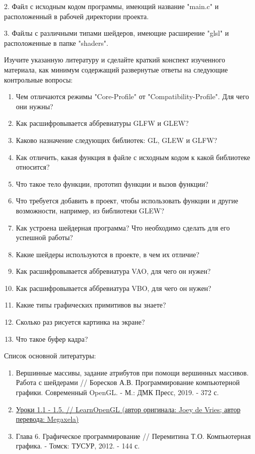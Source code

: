 \documentclass[a4paper,12pt]{article}
\theoremstyle{plain}
\begin{document}
    2. Файл с исходным кодом программы, имеющий название "main.c" и расположенный в рабочей директории проекта.
    
    3. Файлы с различными типами шейдеров, имеющие расширение "glsl" и расположенные в папке "shaders".
    
    
    
    Изучите указанную литературу и сделайте краткий конспект изученного материала, как минимум содержащий развернутые ответы на следующие контрольные вопросы:
    \begin{enumerate}
    \item Чем отличаются режимы "Core-Profile" от "Compatibility-Profile". Для чего они нужны?
    \item Как расшифровывается аббревиатуры GLFW и GLEW?
    \item Каково назначение следующих библиотек: GL, GLEW и GLFW? 
    \item Как отличить, какая функция в файле с исходным кодом к какой библиотеке относится?
    \item Что такое тело функции, прототип функции и вызов функции?
    \item Что требуется добавить в проект, чтобы использовать функции и другие возможности, например, из библиотеки GLEW?
    \item Как устроена шейдерная программа? Что необходимо сделать для его успешной работы?
    \item Какие шейдеры используются в проекте, в чем их отличие?
    \item Как расшифровывается аббревиатура VAO, для чего он нужен?
    \item Как расшифровывается аббревиатура VBO, для чего он нужен?
    \item Какие типы графических примитивов вы знаете?
    \item Сколько раз рисуется картинка на экране?
    \item Что такое буфер кадра?
    \end{enumerate}
    
    
    
    Список основной литературы:
    
    \begin{enumerate}
        \item 
        Вершинные массивы, задание атрибутов при помощи вершинных массивов. Работа с шейдерами // Боресков А.В. Программирование компьютерной графики. Современный OpenGL. - М.: ДМК Пресс, 2019. - 372 с.
        \item 
        \href{https://habr.com/ru/post/310790/}{Уроки 1.1 - 1.5. // LearnOpenGL (автор оригинала: Joey de Vries; автор перевода: Megaxela)} 
        
        \item
        Глава 6. Графическое программирование // Перемитина Т.О. Компьютерная графика. - Томск: ТУСУР, 2012. - 144 с.
        
        \end{enumerate}
\end{document}
